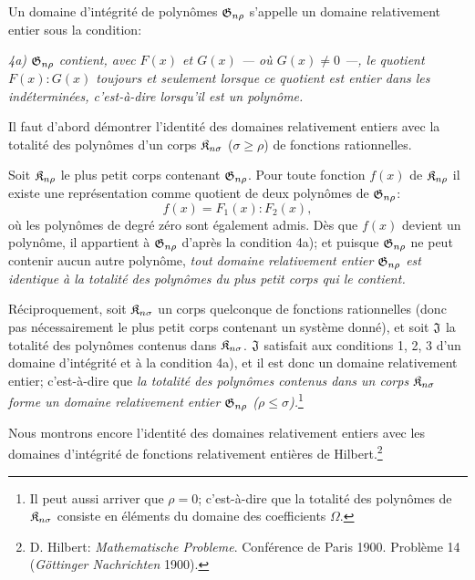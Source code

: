 Un domaine d’intégrité de polynômes $\mathfrak{G}_{n\rho}$ s'appelle un \og{} domaine relativement entier \fg{} sous la condition:

\emph{4a) $\mathfrak{G}_{n\rho}$ contient, avec $F(x)$ et $G(x)$ --- où $G(x)\ne0$ ---, le quotient $F(x):G(x)$ toujours et seulement lorsque ce quotient est entier dans les indéterminées, c'est-à-dire lorsqu'il est un polynôme.}

Il faut d'abord démontrer l'identité des domaines relativement entiers avec la totalité des polynômes d'un corps $\mathfrak{K}_{n\sigma}$ ($\sigma\ge\rho$) de fonctions rationnelles.

Soit $\mathfrak{K}_{n\rho}$ le plus petit corps contenant $\mathfrak{G}_{n\rho}$. Pour toute fonction $f(x)$ de $\mathfrak{K}_{n\rho}$ il existe une représentation comme quotient de deux polynômes de $\mathfrak{G}_{n\rho}$:
\[
  f(x)=F_1(x):F_2(x),
\]
où les polynômes de degré zéro sont également admis. Dès que $f(x)$ devient un polynôme, il appartient à $\mathfrak{G}_{n\rho}$ d'après la condition 4a); et puisque $\mathfrak{G}_{n\rho}$ ne peut contenir aucun autre polynôme, \emph{tout domaine relativement entier $\mathfrak{G}_{n\rho}$ est identique à la totalité des polynômes du plus petit corps qui le contient.}

Réciproquement, soit $\mathfrak{K}_{n\sigma}$ un corps quelconque de fonctions rationnelles (donc pas nécessairement le plus petit corps contenant un système donné), et soit $\mathfrak{J}$ la totalité des polynômes contenus dans $\mathfrak{K}_{n\sigma}$. $\mathfrak{J}$ satisfait aux conditions 1, 2, 3 d'un domaine d’intégrité et à la condition 4a), et il est donc un domaine relativement entier; c'est-à-dire que \emph{la totalité des polynômes contenus dans un corps $\mathfrak{K}_{n\sigma}$ forme un domaine relativement entier $\mathfrak{G}_{n\rho}$ ($\rho\le\sigma$).}\footnote{Il peut aussi arriver que $\rho=0$; c'est-à-dire que la totalité des polynômes de $\mathfrak{K}_{n\sigma}$ consiste en éléments du domaine des coefficients $\Omega$.}

Nous montrons encore l'identité des domaines relativement entiers avec les \og{} domaines d’intégrité de fonctions relativement entières \fg{} de Hilbert.\footnote{D. Hilbert: \emph{Mathematische Probleme}. Conférence de Paris 1900. Problème 14 (\emph{Göttinger Nachrichten} 1900).}

